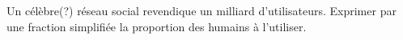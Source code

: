
\begin{exercice}\label{exosmath-0795}

    Un célèbre(?) réseau social revendique un milliard d'utilisateurs. Exprimer par une fraction simplifiée la proportion des humains à l'utiliser.

\end{exercice}
